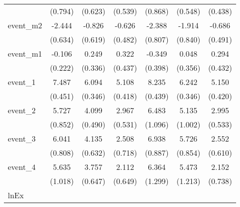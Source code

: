 {\begin{tabular}{l*{6}{c}}
            &     (0.794)         &     (0.623)         &     (0.539)         &     (0.868)         &     (0.548)         &     (0.438)         \\
[1em]
event\_m2    &      -2.444\sym{***}&      -0.826         &      -0.626         &      -2.388\sym{**} &      -1.914\sym{*}  &      -0.686         \\
            &     (0.634)         &     (0.619)         &     (0.482)         &     (0.807)         &     (0.840)         &     (0.491)         \\
[1em]
event\_m1    &      -0.106         &       0.249         &       0.322         &      -0.349         &       0.048         &       0.294         \\
            &     (0.222)         &     (0.336)         &     (0.437)         &     (0.398)         &     (0.356)         &     (0.432)         \\
[1em]
event\_1     &       7.487\sym{***}&       6.094\sym{***}&       5.108\sym{***}&       8.235\sym{***}&       6.242\sym{***}&       5.150\sym{***}\\
            &     (0.451)         &     (0.346)         &     (0.418)         &     (0.439)         &     (0.346)         &     (0.420)         \\
[1em]
event\_2     &       5.727\sym{***}&       4.099\sym{***}&       2.967\sym{***}&       6.483\sym{***}&       5.135\sym{***}&       2.995\sym{***}\\
            &     (0.852)         &     (0.490)         &     (0.531)         &     (1.096)         &     (1.002)         &     (0.533)         \\
[1em]
event\_3     &       6.041\sym{***}&       4.135\sym{***}&       2.508\sym{***}&       6.938\sym{***}&       5.726\sym{***}&       2.552\sym{***}\\
            &     (0.808)         &     (0.632)         &     (0.718)         &     (0.887)         &     (0.854)         &     (0.610)         \\
[1em]
event\_4     &       5.635\sym{***}&       3.757\sym{***}&       2.112\sym{**} &       6.364\sym{***}&       5.473\sym{***}&       2.152\sym{**} \\
            &     (1.018)         &     (0.647)         &     (0.649)         &     (1.299)         &     (1.213)         &     (0.738)         \\
\hline
lnEx        &                     &                     &                     &                     &                     &                     \\

\end{tabular}}
